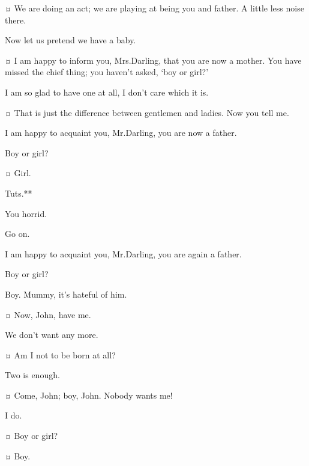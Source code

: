 \begin{drama}
\johnspeaks {}¤
We are doing an act; we are playing at being you and father.
A little less noise there.

\wendyspeaks
Now let us pretend we have a baby.

\johnspeaks {}¤
I am happy to inform you, Mrs.\@ Darling, that you are now a mother.
You have missed the chief thing; you haven’t asked, ‘boy or girl?’

\wendyspeaks
I am so glad to have one at all, I don’t care which it is.

\johnspeaks {}¤
That is just the difference between gentlemen and ladies.
Now you tell me.

\wendyspeaks
I am happy to acquaint you, Mr.\@ Darling, you are now a father.

\johnspeaks
Boy or girl?

\wendyspeaks {}¤
Girl.

\johnspeaks
Tuts.**

\wendyspeaks
You horrid.

\johnspeaks
Go on.

\wendyspeaks
I am happy to acquaint you, Mr.\@ Darling, you are again a father.

\johnspeaks
Boy or girl?

\wendyspeaks
Boy.
Mummy, it’s hateful of him.


\michaelspeaks {}¤
Now, John, have me.

\johnspeaks
We don’t want any more.

\michaelspeaks {}¤
Am I not to be born at all?

\johnspeaks
Two is enough.

\michaelspeaks {}¤
Come, John; boy, John.
Nobody wants me!

\mrsdarlingspeaks
I do.

\michaelspeaks {}¤
Boy or girl?

\mrsdarlingspeaks {}¤
Boy.


\end{drama}
